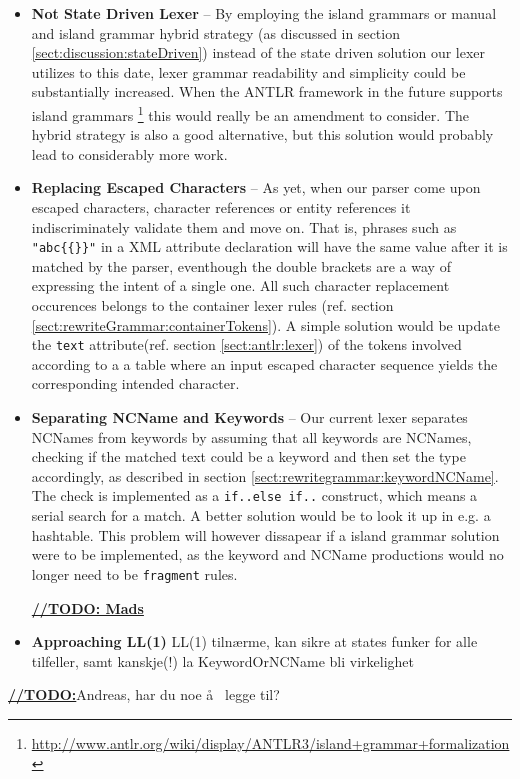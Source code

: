 \begin{itemize}

\item \textbf{Not State Driven Lexer} -- By employing the island grammars or manual and island grammar hybrid strategy (as discussed in section \ref{sect:discussion:stateDriven}) instead of the state driven solution our lexer utilizes to this date, lexer grammar readability and simplicity could be substantially increased. When the ANTLR framework in the future supports island grammars \footnote{\url{http://www.antlr.org/wiki/display/ANTLR3/island+grammar+formalization}} this would really be an amendment to consider. The hybrid strategy is also a good alternative, but this solution would probably lead to considerably more work.

\item \textbf{Replacing Escaped Characters} -- As yet, when our parser come upon escaped characters, character references or entity references it indiscriminately validate them and move on. That is, phrases such as \verb!"abc{{}}"! in a XML attribute declaration will have the same value after it is matched by the parser, eventhough the double brackets are a way of expressing the intent of a single one. All such character replacement occurences belongs to the container lexer rules (ref. section \ref{sect:rewriteGrammar:containerTokens}). A simple solution would be update the \verb!text! attribute(ref. section \ref{sect:antlr:lexer}) of the tokens involved according to a a table where an input escaped character sequence yields the corresponding intended character.

\item \textbf{Separating NCName and Keywords} -- Our current lexer separates NCNames from keywords by assuming that all keywords are NCNames, checking if the matched text could be a keyword and then set the type accordingly, as described in section \ref{sect:rewritegrammar:keywordNCName}. The check is implemented as a \verb!if..else if..! construct, which means a serial search for a match. A better solution would be to look it up in e.g. a hashtable. This problem will however dissapear if a island grammar solution were to be implemented, as the keyword and NCName productions would no longer need to be \verb!fragment! rules.


 \underline{\textbf{\LARGE //TODO: Mads}} 

\item \textbf{Approaching LL(1)} LL(1) tiln\ae rme, kan sikre at states funker for alle tilfeller, samt kanskje(!) la KeywordOrNCName bli virkelighet

\end{itemize}

\underline{\textbf{\LARGE //TODO:}}Andreas, har du noe \aa~ legge til?




